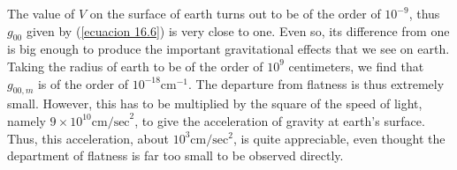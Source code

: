 The value of $V$ on the surface of earth turns out to be of the order of $10^{-9}$, thus $g_{00}$ given by 
(\ref{ecuacion 16.6}) is very close to one. Even so, its difference from one is big enough to produce the important 
gravitational effects that we see on earth. Taking the radius of earth to be of the order of $10^9$ centimeters, we 
find that $g_{00,m}$ is of the order of $10^{-18}\mbox{cm}^{-1}$. The departure from flatness is thus extremely small. 
However, this has to be multiplied by the square of the speed of light, namely $9\times 10^{10} \mbox{cm/sec}^2$, to 
give the acceleration of gravity at earth's surface. Thus, this acceleration, about $10^3 \mbox{cm}/\mbox{sec}^2$, is 
quite appreciable, even thought the department of flatness is far too small to be observed directly.




